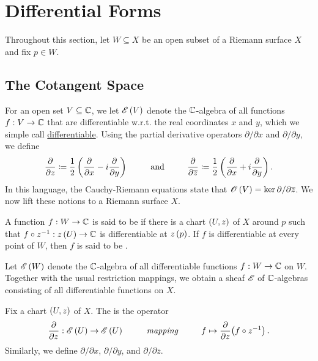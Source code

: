 \documentclass[../Moduli_Spaces_of_Riemann_Surfaces.tex]{subfiles}
\begin{document}
    \section{Differential Forms}\label{sec:differential_forms}
    Throughout this section, let $W\subseteq X$ be an open subset of a Riemann surface $X$ and fix $p\in W$.
    \subsection{The Cotangent Space}
    For an open set $V\subseteq\mathbb{C}$, we let $\mathscr{E}\left(V\right)$ denote the $\mathbb{C}$-algebra of all functions $f:V\to\mathbb{C}$ that are differentiable w.r.t. the real coordinates $x$ and $y$, which we simple call \ul{differentiable}. Using the partial derivative operators $\partial/\partial x$ and $\partial/\partial y$, we define
    \begin{equation*}
        \frac{\partial}{\partial z}\coloneqq\frac{1}{2}\l(\frac{\partial}{\partial x}-i\frac{\partial}{\partial y}\r)\ \ \ \ \ \ \ \ \textrm{and}\ \ \ \ \ \ \ \ \frac{\partial}{\partial\bar{z}}\coloneqq\frac{1}{2}\l(\frac{\partial}{\partial x}+i\frac{\partial}{\partial y}\r).
    \end{equation*}
    In this language, the Cauchy-Riemann equations state that $\mathscr{O}\left(V\right)=\ker\partial/\partial\overline{z}$. We now lift these notions to a Riemann surface $X$.
    \begin{definition}
        A function $f:W\to\mathbb{C}$ is said to be  if there is a chart $\left(U,z\right)$ of $X$ around $p$ such that $f\circ z^{-1}:z\left(U\right)\to\mathbb{C}$ is differentiable at $z\left(p\right)$. If $f$ is differentiable at every point of $W$, then $f$ is said to be .
    \end{definition}
    \vspace{-0.05in}
    \begin{remark}
        Let $\mathscr{E}\left(W\right)$ denote the $\mathbb{C}$-algebra of all differentiable functions $f:W\to\mathbb{C}$ on $W$. Together with the usual restriction mappings, we obtain a sheaf $\mathscr{E}$ of $\mathbb{C}$-algebras consisting of all differentiable functions on $X$.\exqed
    \end{remark}
    \begin{definition}\label{3.1:def:partial_derivative}
        Fix a chart $\left(U,z\right)$ of $X$. The  is the operator
        \begin{equation*}
            \frac{\partial}{\partial z}:\DIFF\l(U\r)\to\DIFF\l(U\r)\ \ \ \ \ \ \ \ \textrm{\it{mapping}}\ \ \ \ \ \ \ \ f\mapsto\frac{\partial}{\partial z}\!\l(f\circ z^{-1}\r).
        \end{equation*}
        Similarly, we define $\partial/\partial x$, $\partial/\partial y$, and $\partial/\partial\bar{z}$.
    \end{definition}
\end{document}
